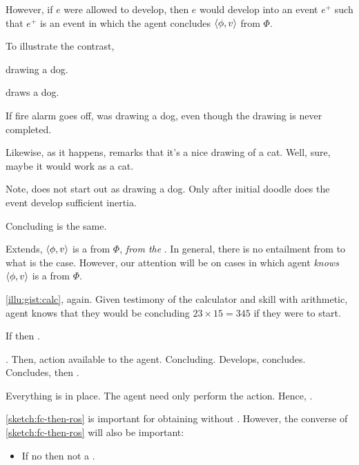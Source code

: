 \begin{note}
\begin{itemize}
    However, if \(e\) were allowed to develop, then \(e\) would develop into an event \(e^{+}\) such that \(e^{+}\) is an event in which the agent concludes \(\langle \phi, v \rangle\) from \(\Phi\).
  \end{itemize}

  To illustrate the contrast,

  drawing a dog.

  draws a dog.

  If fire alarm goes off, was drawing a dog, even though the drawing is never completed.

  Likewise, as it happens, remarks that it's a nice drawing of a cat.
  Well, sure, maybe it would work as a cat.

  Note, does not start out as drawing a dog.
  Only after initial doodle does the event develop sufficient inertia.

  Concluding is the same.
\end{note}

\begin{note}
  Extends, \(\langle \phi, v \rangle\) is a  from \(\Phi\), \emph{from the \agpe{}}.
  In general, there is no entailment from \agpe{} to what is the case.
  However, our attention will be on cases in which agent \emph{knows} \(\langle \phi, v \rangle\) is a  from \(\Phi\).

  \autoref{illu:gist:calc}, again.
  Given testimony of the calculator and skill with arithmetic, agent knows that they would be concluding \(23 \times 15 = 345\) if they were to start.
\end{note}

\begin{note}

  \begin{sketch}
    \label{sketch:fc-then-ros}
    If \fc{} then \ros{}.
  \end{sketch}

  \fc{}.
  Then, action available to the agent.
  Concluding.
  Develops, concludes.
  Concludes, then \ros{}.

  Everything is in place.
  The agent need only perform the action.
  Hence, \ros{}.
\end{note}

\begin{note}
  \autoref{sketch:fc-then-ros} is important for obtaining  without .
  However, the converse of \autoref{sketch:fc-then-ros} will also be important:

  \begin{itemize}
  \item
    If no \ros{} then not a \fc{}.
  \end{itemize}
\end{note}


